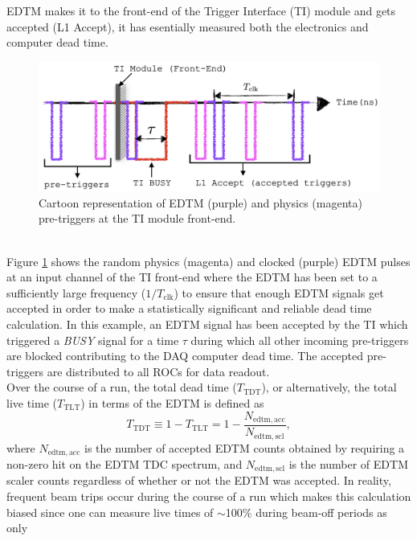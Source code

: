 \documentclass[11pt]{article}
\begin{document}
EDTM makes it to the front-end of the Trigger Interface (TI) module and gets accepted (L1 Accept), it has esentially measured both the electronics and computer dead time.\\
\begin{figure}[H]
  \centering
  \includegraphics[scale=0.40]{images/EDTM_TI.png}
  \caption{Cartoon representation of EDTM (purple) and physics (magenta) pre-triggers at the TI module front-end.}
  \label{fig:EDTM_TI}
\end{figure}\\
\indent Figure \ref{fig:EDTM_TI} shows the random physics (magenta) and clocked (purple) EDTM pulses at an input channel of the TI front-end where the EDTM has
been set to a sufficiently large frequency ($1/T_{\mathrm{clk}}$) to ensure that enough EDTM signals get accepted in order to make a statistically significant and
reliable dead time calculation. In this example, an EDTM signal has been accepted by the TI which triggered a \textit{BUSY} signal for a time $\tau$ during which all other incoming pre-triggers are blocked
contributing to the DAQ computer dead time. The accepted pre-triggers are distributed to all ROCs for data readout. \\
\indent Over the course of a run, the total dead time ($T_{\mathrm{TDT}}$), or alternatively, the total live time ($T_{\mathrm{TLT}}$) in terms of the EDTM is defined as
\begin{equation}
 T_{\mathrm{TDT}} \equiv 1 - T_{\mathrm{TLT}} = 1 - \frac{N_{\mathrm{edtm,acc}}}{N_{\mathrm{edtm,scl}}},
  \label{eq:3.24}
\end{equation}
where $N_{\mathrm{edtm,acc}}$ is the number of accepted EDTM counts obtained by requiring a non-zero hit on the EDTM TDC spectrum, and $N_{\mathrm{edtm,scl}}$ is the number of EDTM scaler counts regardless of whether or not
the EDTM was accepted. In reality, frequent beam trips occur during the course of a run which makes this calculation biased since one can measure live times of $\sim$100$\%$ during beam-off periods as only
\end{document}
